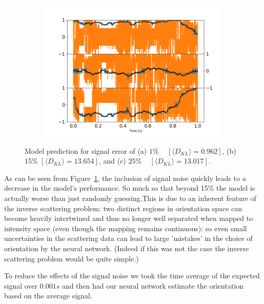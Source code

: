 \begin{figure}[h!]
\begin{subfigure}{0.32\textwidth}
		\includegraphics[width=\textwidth]{fig10c.png}
	\end{subfigure}
	\caption{Model prediction for signal error of (a) $1\%$ ~
		$[\langle D_{KL}\rangle=0.962]$, (b) $15\%$ $[\langle D_{KL}\rangle=13.654]$, and (c) $25\%$ ~  $[\langle D_{KL}\rangle=13.017]$.}
	\label{fig:epsilon}
\end{figure}

As can be seen from Figure~\ref{fig:epsilon}, the inclusion of 
signal noise quickly leads to a decrease in the model's 
performance. So much so that beyond 15\% the model is actually 
worse than just randomly guessing.This is due to an inherent 
feature of the inverse scattering problem: two distinct regions 
in orientation space can become heavily intertwined and thus no 
longer well separated when mapped to intensity space (even 
though the mapping remains continuous): so even small 
uncertainties in the scattering data can lead to large 'mistakes' 
in the choice of orientation by the neural network. (Indeed if 
this was not the case the inverse scattering problem would be 
quite simple.) 

To reduce the effects of the signal noise we took the time 
average of the expected signal over $0.001 s$ and then had our 
neural network estimate the orientation based on the average 
signal.

